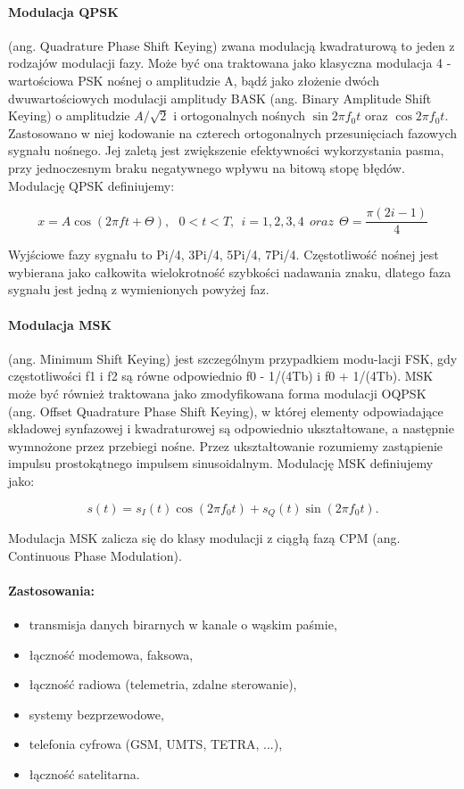\documentclass[]{report}
\begin{document}
\paragraph{Modulacja QPSK} (ang. Quadrature Phase Shift Keying) zwana modulacją kwadraturową to jeden z rodzajów modulacji fazy. Może być ona traktowana jako klasyczna modulacja 4 - wartościowa PSK nośnej o amplitudzie A, bądź jako złożenie dwóch dwuwartościowych modulacji amplitudy BASK (ang. Binary Amplitude Shift Keying) o amplitudzie $A/\sqrt{2}$  i ortogonalnych nośnych $\sin 2\pi f_{0}t $  oraz  $\cos 2\pi f_{0}t $. Zastosowano w niej kodowanie na czterech ortogonalnych przesunięciach fazowych sygnału nośnego. Jej zaletą jest zwiększenie efektywności wykorzystania pasma, przy jednoczesnym braku negatywnego wpływu na bitową stopę błędów. Modulację QPSK definiujemy:

\begin{equation}
x=A\cos(2\pi ft + \Theta), ~~~0<t<T,~~i=1,2,3,4~~oraz~~\Theta = \dfrac{\pi(2i-1)}{4}
\end{equation}

Wyjściowe fazy sygnału to Pi/4, 3Pi/4, 5Pi/4, 7Pi/4. Częstotliwość nośnej jest wybierana jako całkowita wielokrotność szybkości nadawania znaku, dlatego faza sygnału jest jedną z wymienionych powyżej faz.

\paragraph{Modulacja MSK}
 (ang. Minimum Shift Keying) jest szczególnym przypadkiem modu-lacji FSK, gdy częstotliwości f1 i f2 są równe odpowiednio f0 - 1/(4Tb) i f0 + 1/(4Tb). MSK może być również traktowana jako zmodyfikowana forma modulacji OQPSK (ang. Offset Quadrature Phase Shift Keying), w której elementy odpowiadające składowej synfazowej i kwadraturowej są odpowiednio ukształtowane, a następnie wymnożone przez przebiegi nośne. Przez ukształtowanie rozumiemy zastąpienie impulsu prostokątnego impulsem sinusoidalnym. Modulację MSK definiujemy jako:
 
\begin{equation}
s(t)=s_{I}(t)\cos (2\pi f_{0}t)+s_{Q}(t)\sin (2\pi f_{0}t).
\end{equation}

Modulacja MSK zalicza się do klasy modulacji z ciągłą fazą CPM (ang. Continuous Phase Modulation).


\paragraph{Zastosowania:}
\begin{itemize}
\item transmisja danych birarnych w kanale o wąskim paśmie,
\item łączność modemowa, faksowa,
\item łączność radiowa (telemetria, zdalne sterowanie),
\item systemy bezprzewodowe,
\item telefonia cyfrowa (GSM, UMTS, TETRA, ...),
\item łączność satelitarna.
\end{itemize}
\end{document}
